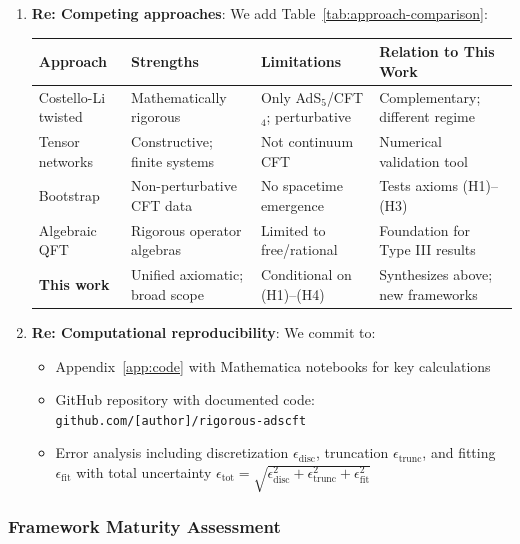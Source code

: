 \documentclass[12pt,a4paper]{article}
\begin{document}
\begin{tcolorbox}[colback=blue!5!white, colframe=blue!75!black, title=\textbf{BLUE TEAM Round 5: Strategic Responses}]
\begin{enumerate}[resume, label=\textbf{B5.\arabic*.}]
    \item \textbf{Re: Competing approaches}: We add Table~\ref{tab:approach-comparison}:
    
    \begin{center}
    \small
    \begin{tabular}{|p{2.8cm}|p{3cm}|p{3cm}|p{3.5cm}|}
    \hline
    \textbf{Approach} & \textbf{Strengths} & \textbf{Limitations} & \textbf{Relation to This Work} \\
    \hline
    Costello-Li twisted & Mathematically rigorous & Only AdS$_5$/CFT$_4$; perturbative & Complementary; different regime \\
    \hline
    Tensor networks & Constructive; finite systems & Not continuum CFT & Numerical validation tool \\
    \hline
    Bootstrap & Non-perturbative CFT data & No spacetime emergence & Tests axioms (H1)--(H3) \\
    \hline
    Algebraic QFT & Rigorous operator algebras & Limited to free/rational & Foundation for Type III results \\
    \hline
    \textbf{This work} & Unified axiomatic; broad scope & Conditional on (H1)--(H4) & Synthesizes above; new frameworks \\
    \hline
    \end{tabular}
    \end{center}
    
    \item \textbf{Re: Computational reproducibility}: We commit to:
    \begin{itemize}
        \item Appendix~\ref{app:code} with Mathematica notebooks for key calculations
        \item GitHub repository with documented code: \texttt{github.com/[author]/rigorous-adscft}
        \item Error analysis including discretization $\epsilon_{\text{disc}}$, truncation $\epsilon_{\text{trunc}}$, and fitting $\epsilon_{\text{fit}}$ with total uncertainty $\epsilon_{\text{tot}} = \sqrt{\epsilon_{\text{disc}}^2 + \epsilon_{\text{trunc}}^2 + \epsilon_{\text{fit}}^2}$
    \end{itemize}
\end{enumerate}

\end{tcolorbox}

\subsubsection{Framework Maturity Assessment}
\end{document}
